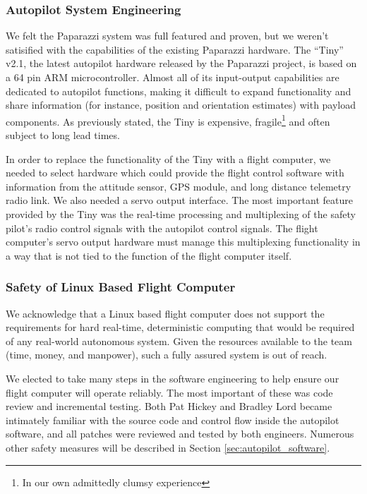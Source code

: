\documentclass[10pt,twocolumns]{report}
\begin{document}
\subsubsection{Autopilot System Engineering}

We felt the Paparazzi system was full featured and proven, but we weren't satisified with the capabilities of the existing Paparazzi hardware. The ``Tiny'' v2.1\cite{paparazzi_tinyv21}, the latest autopilot hardware released by the Paparazzi project, is based on a 64 pin ARM microcontroller. Almost all of its input-output capabilities are dedicated to autopilot functions, making it difficult to expand functionality and share information (for instance, position and orientation estimates) with payload components. As previously stated, the Tiny is expensive, fragile\footnote{In our own admittedly clumsy experience} and often subject to long lead times. 

In order to replace the functionality of the Tiny with a flight computer, we needed to select hardware which could provide the flight control software with information from the attitude sensor, GPS module, and long distance telemetry radio link. We also needed a servo output interface. The most important feature provided by the Tiny was the real-time processing and multiplexing of the safety pilot's radio control signals with the autopilot control signals. The flight computer's servo output hardware must manage this multiplexing functionality in a way that is not tied to the function of the flight computer itself. 

\subsubsection{Safety of Linux Based Flight Computer}

We acknowledge that a Linux based flight computer does not support the requirements for hard real-time, deterministic computing that would be required of any real-world autonomous system. Given the resources available to the team (time, money, and manpower), such a fully assured system is out of reach.

We elected to take many steps in the software engineering to help ensure our flight computer will operate reliably. The most important of these was code review and incremental testing. Both Pat Hickey and Bradley Lord became intimately familiar with the source code and control flow inside the autopilot software, and all patches were reviewed and tested by both engineers. Numerous other safety measures will be described in Section \ref{sec:autopilot_software}.
\end{document}
